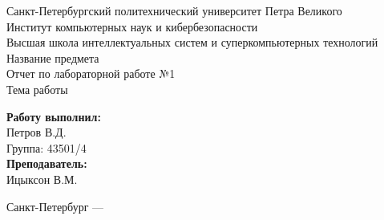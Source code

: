 \begin{titlepage} %

	\begin{center} %
		\large Санкт-Петербургский политехнический университет Петра Великого\\
		\large Институт компьютерных наук и кибербезопасности\\
		\large Высшая школа интеллектуальных систем и суперкомпьютерных технологий\\[6cm] %
		
		\huge Название предмета\\[0.5cm] %
		\large Отчет по лабораторной работе №1\\[0.1cm]
		\large Тема работы\\[4cm]
	\end{center}


	\begin{flushright} %
		\begin{minipage}{0.25\textwidth} %
			\begin{flushleft} %
				\large\textbf{Работу выполнил:}\\
				\large Петров В.Д.\\
				\large {Группа:} 43501/4\\
				
				\large \textbf{Преподаватель:}\\
				\large Ицыксон В.М.
			\end{flushleft}
		\end{minipage}
	\end{flushright}
	
	\vfill %

	\begin{center}
		\large Санкт-Петербург --- \the\year %
	\end{center} %

\end{titlepage} %

\vfill %
